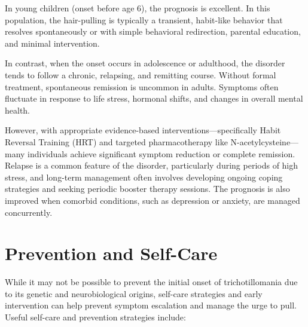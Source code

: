 In young children (onset before age 6), the prognosis is excellent. In this population, the hair-pulling is typically a transient, habit-like behavior that resolves spontaneously or with simple behavioral redirection, parental education, and minimal intervention.

In contrast, when the onset occurs in adolescence or adulthood, the disorder tends to follow a chronic, relapsing, and remitting course. Without formal treatment, spontaneous remission is uncommon in adults. Symptoms often fluctuate in response to life stress, hormonal shifts, and changes in overall mental health.

However, with appropriate evidence-based interventions---specifically Habit Reversal Training (HRT) and targeted pharmacotherapy like N-acetylcysteine---many individuals achieve significant symptom reduction or complete remission. Relapse is a common feature of the disorder, particularly during periods of high stress, and long-term management often involves developing ongoing coping strategies and seeking periodic booster therapy sessions. The prognosis is also improved when comorbid conditions, such as depression or anxiety, are managed concurrently.

\section*{Prevention and Self-Care}
While it may not be possible to prevent the initial onset of trichotillomania due to its genetic and neurobiological origins, self-care strategies and early intervention can help prevent symptom escalation and manage the urge to pull. Useful self-care and prevention strategies include:

